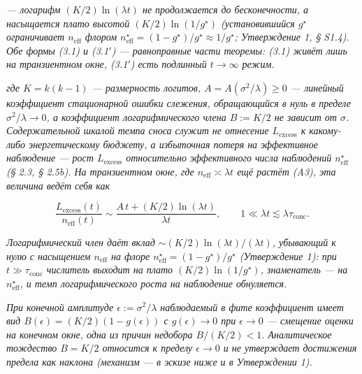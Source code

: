 \documentclass[12pt]{iopart}
\begin{document}
\emph{--- логарифм \((K/2)\ln(\lambda t)\) \emph{не} продолжается до бесконечности, а насыщается плато высотой \((K/2)\ln(1/g^\star)\) (установившийся \(g^\star\) ограничивает \(n_{\text{eff}}\) флором \(n_{\text{eff}}^\star = (1-g^\star)/g^\star \approx 1/g^\star\); Утверждение 1, § S1.4). Обе формы (3.1) и (3.1\('\)) --- равноправные части теоремы: (3.1) живёт лишь на транзиентном окне, (3.1\('\)) есть подлинный \(t\to\infty\) режим.}



\emph{где \(K = k(k-1)\) --- размерность логитов, \(A = A(\sigma^2/\lambda) \ge 0\) --- линейный коэффициент стационарной ошибки слежения, обращающийся в нуль в пределе \(\sigma^2/\lambda \to 0\), а коэффициент логарифмического члена \(B := K/2\) не зависит от \(\sigma\). Содержательной шкалой темпа сноса служит не отнесение \(L_{\text{excess}}\) к какому-либо энергетическому бюджету, а избыточная потеря на эффективное наблюдение --- рост \(L_{\text{excess}}\) относительно эффективного числа наблюдений \(n_{\text{eff}}^\star\) (§ 2.3, § 2.5b). На транзиентном окне, где \(n_{\text{eff}} \asymp \lambda t\) ещё растёт (A3), эта величина ведёт себя как}



\begin{equation}\frac{L_{\text{excess}}(t)}{n_{\text{eff}}(t)} \sim \frac{A\,t + (K/2)\ln(\lambda t)}{\lambda t}, \qquad 1\ll\lambda t\lesssim\lambda\tau_{\text{conc}}. \tag{3.2}\end{equation}



\emph{Логарифмический член даёт вклад \(\sim (K/2)\ln(\lambda t)/(\lambda t)\), убывающий к нулю с насыщением \(n_{\text{eff}}\) на флоре \(n_{\text{eff}}^\star = (1-g^\star)/g^\star\) (Утверждение 1): при \(t\gg\tau_{\text{conc}}\) числитель выходит на плато \((K/2)\ln(1/g^\star)\), знаменатель --- на \(n_{\text{eff}}^\star\), и темп логарифмического роста на наблюдение обнуляется.}



\emph{При конечной амплитуде \(\epsilon := \sigma^2/\lambda\) наблюдаемый в фите коэффициент имеет вид \(B(\epsilon) = (K/2)(1 - g(\epsilon))\) с \(g(\epsilon) \to 0\) при \(\epsilon \to 0\) --- смещение оценки на конечном окне, одна из причин недобора \(B/(K/2) < 1\). Аналитическое тождество \(B = K/2\) относится к пределу \(\epsilon\to 0\) и не утверждает достижения предела как наклона (механизм --- в эскизе ниже и в Утверждении 1).}
\end{document}
